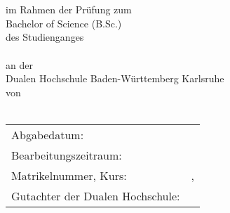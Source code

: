 







\thispagestyle{empty}
\begin{titlepage}
\enlargethispage{4cm}


\begin{center}
	\huge{\textbf{\titel}}\\[1cm]
	\Large{\textbf{\arbeit}}\\[0.5cm]
	\normalsize{im Rahmen der Prüfung zum} \\[0.2cm] 
	\Large{Bachelor of Science (B.Sc.)}\\[0.2cm]
	\normalsize{des Studienganges} \\ [0.2cm]
	\Large{\studiengang}\\[1ex]
	\normalsize{an der} \\ [0.2cm]
	\Large{Dualen Hochschule Baden-Württemberg Karlsruhe}\\[0.2cm]
	\normalsize{von}\\[0.5cm] \Large{\textbf{\autor}} \\
\end{center}

\begin{center}
	\vfill
	\begin{tabular}{ll}
		Abgabedatum:                     & \abgabe \\[0.2cm]
		Bearbeitungszeitraum:            & \bearbeitungszeitraum \\ [0.2cm]
		Matrikelnummer, Kurs:            & \matrikelnr , \kurs \\[0.2cm]
		Gutachter der Dualen Hochschule: & \betreuerDhbw \\[2cm]
	\end{tabular} 
\end{center}
\end{titlepage}